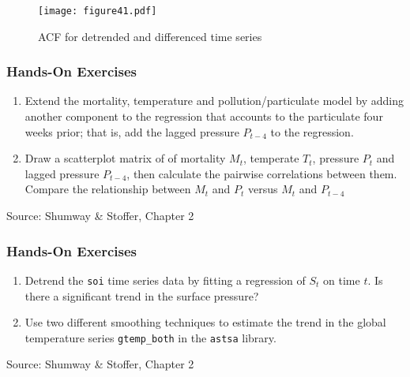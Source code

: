 \begin{figure}
\centering
\texttt{[image: figure41.pdf]}
\caption{ACF for detrended and differenced time series}
\label{fig:figure41}
\end{figure}

\begin{tcolorbox}[colback=code]
\subsubsection*{Hands-On Exercises} 
\begin{enumerate}
  \item Extend the mortality, temperature and pollution/particulate model by adding another component to the regression that accounts to the particulate four weeks prior; that is, add the lagged pressure $P_{t-4}$ to the regression.
  \item Draw a scatterplot matrix of of mortality $M_t$, temperate $T_t$, pressure $P_t$ and lagged pressure $P_{t-4}$, then calculate the pairwise correlations between them. Compare the relationship between $M_t$ and $P_t$ versus $M_t$ and $P_{t-4}$
\end{enumerate}

{\footnotesize \vspace{\baselineskip} Source: Shumway \& Stoffer, Chapter 2}
\end{tcolorbox}

\begin{tcolorbox}[colback=code]
\subsubsection*{Hands-On Exercises} 
\begin{enumerate}
  \item Detrend the \texttt{soi} time series data by fitting a regression of $S_t$ on time $t$. Is there a significant trend in the surface pressure?
  \item Use two different smoothing techniques to estimate the trend in the global temperature series \texttt{gtemp\_both} in the \texttt{astsa} library.
\end{enumerate}

{\footnotesize \vspace{\baselineskip} Source: Shumway \& Stoffer, Chapter 2}
\end{tcolorbox}

